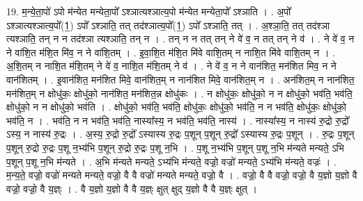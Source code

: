 \documentclass[17pt]{extarticle}
\begin{document}
19. म॒न्ये॒ता॒पो॑ ऽपो म॑न्येत मन्येता॒पो᳚ ऽश्ञात्यश्ञात्य॒पो म॑न्येत मन्येता॒पो᳚ ऽश्ञाति । . अ॒पो᳚ ऽश्ञात्यश्ञात्य॒पो᳚(1॒) ऽपो᳚ ऽश्ञाति॒ तत् तद॑श्ञात्य॒पो᳚(1॒) ऽपो᳚ ऽश्ञाति॒ तत् । . अ॒श्ञा॒ति॒ तत् तद॑श्ञा त्यश्ञाति॒ तन् न न तद॑श्ञा त्यश्ञाति॒ तन् न । . तन् न न तत् तन् ने वे॑ व॒ न तत् तन् ने व॑ । . ने वे॑ व॒ न ने वा॑शि॒त म॑शि॒त मि॑व॒ न ने वा॑शि॒तम् । . इ॒वा॒शि॒त म॑शि॒त मि॑वे वाशि॒तम् न नाशि॒त मि॑वे वाशि॒तम् न । . अ॒शि॒तम् न नाशि॒त म॑शि॒तम् ने वे॑ व॒ नाशि॒त म॑शि॒तम् ने व॑ । . ने वे॑ व॒ न ने वान॑शित॒ मन॑शित मिव॒ न ने वान॑शितम् । . इ॒वान॑शित॒ मन॑शित मिवे॒ वान॑शित॒म् न नान॑शित मिवे॒ वान॑शित॒म् न । . अन॑शित॒म् न नान॑शित॒ मन॑शित॒म् न क्षोधु॑कः॒ क्षोधु॑को॒ नान॑शित॒ मन॑शित॒न्न क्षोधु॑कः । . न क्षोधु॑कः॒ क्षोधु॑को॒ न न क्षोधु॑को॒ भव॑ति॒ भव॑ति॒ क्षोधु॑को॒ न न क्षोधु॑को॒ भव॑ति । . क्षोधु॑को॒ भव॑ति॒ भव॑ति॒ क्षोधु॑कः॒ क्षोधु॑को॒ भव॑ति॒ न न भव॑ति॒ क्षोधु॑कः॒ क्षोधु॑को॒ भव॑ति॒ न । . भव॑ति॒ न न भव॑ति॒ भव॑ति॒ नास्या᳚स्य॒ न भव॑ति॒ भव॑ति॒ नास्य॑ । . नास्या᳚स्य॒ न नास्य॑ रु॒द्रो रु॒द्रो᳚ ऽस्य॒ न नास्य॑ रु॒द्रः । . अ॒स्य॒ रु॒द्रो रु॒द्रो᳚ ऽस्यास्य रु॒द्रः प॒शून् प॒शून् रु॒द्रो᳚ ऽस्यास्य रु॒द्रः प॒शून् । . रु॒द्रः प॒शून् प॒शून् रु॒द्रो रु॒द्रः प॒शू न॒भ्य॑भि प॒शून् रु॒द्रो रु॒द्रः प॒शू न॒भि । . प॒शू न॒भ्य॑भि प॒शून् प॒शू न॒भि म॑न्यते मन्यते॒ ऽभि प॒शून् प॒शू न॒भि म॑न्यते । . अ॒भि म॑न्यते मन्यते॒ ऽभ्य॑भि म॑न्यते॒ वज्रो॒ वज्रो॑ मन्यते॒ ऽभ्य॑भि म॑न्यते॒ वज्रः॑ । . म॒न्य॒ते॒ वज्रो॒ वज्रो॑ मन्यते मन्यते॒ वज्रो॒ वै वै वज्रो॑ मन्यते मन्यते॒ वज्रो॒ वै । . वज्रो॒ वै वै वज्रो॒ वज्रो॒ वै य॒ज्ञो य॒ज्ञो वै वज्रो॒ वज्रो॒ वै य॒ज्ञ्ः । . वै य॒ज्ञो य॒ज्ञो वै वै य॒ज्ञ्ः क्षुत् क्षुद् य॒ज्ञो वै वै य॒ज्ञ्ः क्षुत् । \newline
\end{document}
